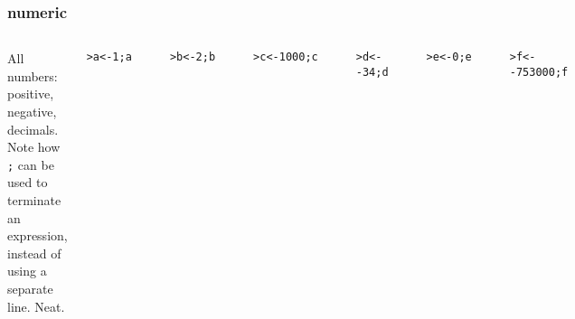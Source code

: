 \documentclass[13pt,aspectratio=169]{beamer}\usepackage[]{graphicx}\usepackage[]{color}
\makeatletter
\newcommand{\hlnum}[1]{\textcolor[rgb]{0.686,0.059,0.569}{#1}}%
\newcommand{\hlopt}[1]{\textcolor[rgb]{0,0,0}{#1}}%
\newcommand{\hlstd}[1]{\textcolor[rgb]{0.345,0.345,0.345}{#1}}%
\newcommand{\hlkwb}[1]{\textcolor[rgb]{0.69,0.353,0.396}{#1}}%
\newenvironment{kframe}{%
 \def\at@end@of@kframe{}%
 \ifinner\ifhmode%
  \def\at@end@of@kframe{\end{minipage}}%
  \begin{minipage}{\columnwidth}%
 \fi\fi%
 \def\FrameCommand##1{\hskip\@totalleftmargin \hskip-\fboxsep
 \colorbox{shadecolor}{##1}\hskip-\fboxsep
     \hskip-\linewidth \hskip-\@totalleftmargin \hskip\columnwidth}%
 \MakeFramed {\advance\hsize-\width
   \@totalleftmargin\z@ \linewidth\hsize
   \@setminipage}}%
 {\par\unskip\endMakeFramed%
 \at@end@of@kframe}
\newenvironment{knitrout}{}{} %
\renewcommand{\tt}[1]{\texttt{#1}}
\renewenvironment{knitrout}{\setlength{\topsep}{0mm}}{}
\makeatother
\begin{document}
\begin{frame}[fragile]
    \frametitle{numeric}
    \begin{columns}[b]
    All numbers:
    positive, negative, decimals.
    Note how \tt{;} can be used to terminate an expression, instead of using a
    separate line. Neat.
\begin{knitrout}\small
{}\color{fgcolor}\begin{kframe}
\begin{alltt}
\hlstd{> }\hlstd{a} \hlkwb{<-} \hlnum{1}\hlstd{; a}
\end{alltt}
\begin{verbatim}
[1] 1
\end{verbatim}
\begin{alltt}
\hlstd{> }\hlstd{b} \hlkwb{<-} \hlnum{2}\hlstd{; b}
\end{alltt}
\begin{verbatim}
[1] 2
\end{verbatim}
\begin{alltt}
\hlstd{> }\hlstd{c} \hlkwb{<-} \hlnum{1000}\hlstd{; c}
\end{alltt}
\begin{verbatim}
[1] 1000
\end{verbatim}
\end{kframe}
\end{knitrout}
\begin{knitrout}\small
{}\color{fgcolor}\begin{kframe}
\begin{alltt}
\hlstd{> }\hlstd{d} \hlkwb{<-} \hlopt{-}\hlnum{34}\hlstd{; d}
\end{alltt}
\begin{verbatim}
[1] -34
\end{verbatim}
\begin{alltt}
\hlstd{> }\hlstd{e} \hlkwb{<-} \hlnum{0}\hlstd{; e}
\end{alltt}
\begin{verbatim}
[1] 0
\end{verbatim}
\begin{alltt}
\hlstd{> }\hlstd{f} \hlkwb{<-} \hlopt{-}\hlnum{753000}\hlstd{; f}
\end{alltt}
\begin{verbatim}
[1] -753000
\end{verbatim}
\end{kframe}
\end{knitrout}

\end{columns}
\end{frame}
\end{document}
